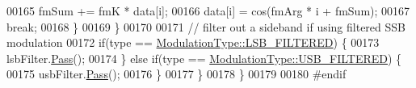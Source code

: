 \begin{DoxyCode}
00165                     fmSum += fmK * data[i];
00166                     data[i] = cos(fmArg * i + fmSum);
00167                     \textcolor{keywordflow}{break};
00168             \}
00169         \}
00170 
00171         \textcolor{comment}{// filter out a sideband if using filtered SSB modulation}
00172         \textcolor{keywordflow}{if}(type == \hyperlink{namespaceradio_a46fb7299001138f28b7f69975c58399eaa6fd9ffa81c9d5e4a255b0c3b2336bd8}{ModulationType::LSB\_FILTERED}) \{
00173             lsbFilter.\hyperlink{classradio_1_1Filter_ad2793821801780809af385463bf8f197}{Pass}();
00174         \} \textcolor{keywordflow}{else} \textcolor{keywordflow}{if}(type == \hyperlink{namespaceradio_a46fb7299001138f28b7f69975c58399ea9d8eca0470206cddb0dd0297717eb876}{ModulationType::USB\_FILTERED}) \{
00175             usbFilter.\hyperlink{classradio_1_1Filter_ad2793821801780809af385463bf8f197}{Pass}();
00176         \}
00177     \}
00178 \}
00179 
00180 \textcolor{preprocessor}{#endif}
\end{DoxyCode}
